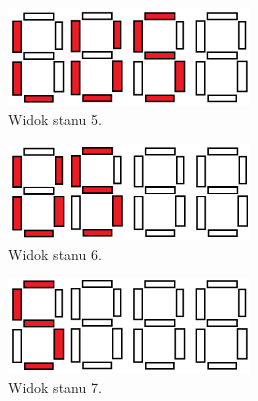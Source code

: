\documentclass[]{article}
\begin{document}
\begin{figure}[H]
	\centering
	\includegraphics[width=0.57\textwidth]{stan5.png}
	\caption{Widok stanu 5.}
\end{figure}
\begin{figure}[H]
	\centering
	\includegraphics[width=0.57\textwidth]{stan6.png}
	\caption{Widok stanu 6.}
\end{figure}
\begin{figure}[H]
	\centering
	\includegraphics[width=0.57\textwidth]{stan7.png}
	\caption{Widok stanu 7.}
\end{figure}
\newpage
\end{document}
